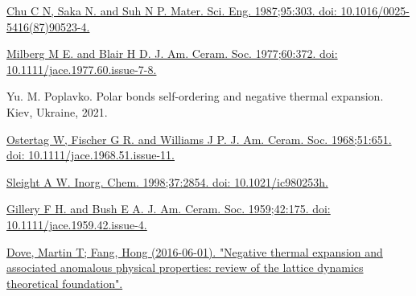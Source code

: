 \documentclass[10pt, a4paper, twocolumn]{article}
\begin{document}
\begin{thebibliography}{9}
 \href{https://scholar.google.com/scholar_lookup?journal=Mater.+Sci.+Eng.&author=C+N+Chu&author=N+Saka&author=N+P+Suh&volume=95&publication_year=1987&pages=303&issn=00255416&doi=10.1016/0025-5416(87)90523-4&}{Chu C N, Saka N. and Suh N P. Mater. Sci. Eng. 1987;95:303. doi: 10.1016/0025-5416(87)90523-4.}  
 
  \href{https://scholar.google.com/scholar_lookup?journal=J.+Am.+Ceram.+Soc.&author=M+E+Milberg&author=H+D+Blair&volume=60&publication_year=1977&pages=372&issn=0002-7820&issn=1551-2916&doi=10.1111/jace.1977.60.issue-7-8&}{Milberg M E. and Blair H D. J. Am. Ceram. Soc. 1977;60:372. doi: 10.1111/jace.1977.60.issue-7-8.}

  Yu. M. Poplavko. Polar bonds self-ordering and negative thermal expansion.  
Kiev, Ukraine, 2021.

  \href{https://scholar.google.com/scholar_lookup?journal=J.+Am.+Ceram.+Soc.&author=W+Ostertag&author=G+R+Fischer&author=J+P+Williams&volume=51&publication_year=1968&pages=651&issn=00027820&issn=15512916&doi=10.1111/jace.1968.51.issue-11&}{Ostertag W, Fischer G R. and Williams J P. J. Am. Ceram. Soc. 1968;51:651. doi: 10.1111/jace.1968.51.issue-11.}

  \href{https://scholar.google.com/scholar_lookup?journal=Inorg.+Chem.&author=A+W+Sleight&volume=37&publication_year=1998&pages=2854&issn=0020-1669&issn=1520-510X&doi=10.1021/ic980253h&}{Sleight A W. Inorg. Chem. 1998;37:2854. doi: 10.1021/ic980253h.}
 
  \href{https://scholar.google.com/scholar_lookup?journal=J.+Am.+Ceram.+Soc.&author=F+H+Gillery&author=E+A+Bush&volume=42&publication_year=1959&pages=175&issn=0002-7820&issn=1551-2916&doi=10.1111/jace.1959.42.issue-4&}{Gillery F H. and Bush E A. J. Am. Ceram. Soc. 1959;42:175. doi: 10.1111/jace.1959.42.issue-4.}

  \href{https://iopscience.iop.org/article/10.1088/0034-4885/79/6/066503}{Dove, Martin T; Fang, Hong (2016-06-01). "Negative thermal expansion and associated anomalous physical properties: review of the lattice dynamics theoretical foundation". }





\end{thebibliography}
\end{document}
